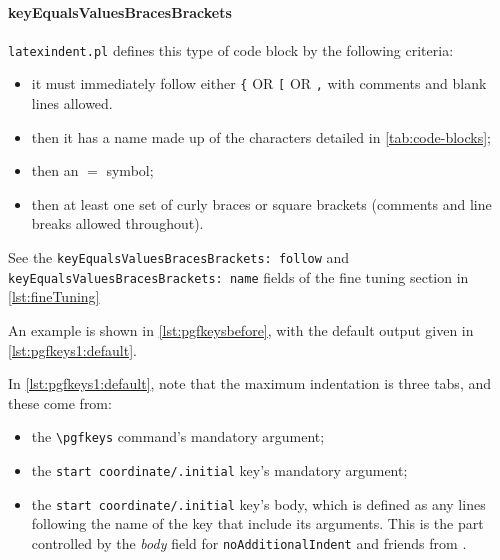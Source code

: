 \documentclass[10pt]{article}
\begin{document}
 \paragraph{keyEqualsValuesBracesBrackets}
  \texttt{latexindent.pl} defines this type of code block by the following criteria:
  \begin{itemize}
   \item it must immediately follow either \lstinline!{! OR \lstinline![! OR
         \lstinline!,! with comments and blank lines allowed.
   \item then it has a name made up of the characters detailed in \vref{tab:code-blocks};
   \item then an $=$ symbol;
   \item then at least one set of curly braces or square brackets (comments and line
         breaks allowed throughout).
  \end{itemize}
  See the \texttt{keyEqualsValuesBracesBrackets: follow} and
  \texttt{keyEqualsValuesBracesBrackets: name} fields of the fine tuning section in
  \vref{lst:fineTuning} %

  \begin{example}
  An example is shown in \cref{lst:pgfkeysbefore}, with the default output given in
  \cref{lst:pgfkeys1:default}.

  \begin{cmhtcbraster}
  \end{cmhtcbraster}

  In \cref{lst:pgfkeys1:default}, note that the maximum indentation is three tabs, and
  these come from:
  \begin{itemize}
   \item the \lstinline!\pgfkeys! command's mandatory argument;
   \item the \lstinline!start coordinate/.initial! key's mandatory argument;
   \item the \lstinline!start coordinate/.initial! key's body, which is defined as any
         lines following the name of the key that include its arguments. This is the part
         controlled by the \emph{body} field for \texttt{noAdditionalIndent} and friends
         from .
  \end{itemize}
  \end{example}
\end{document}
